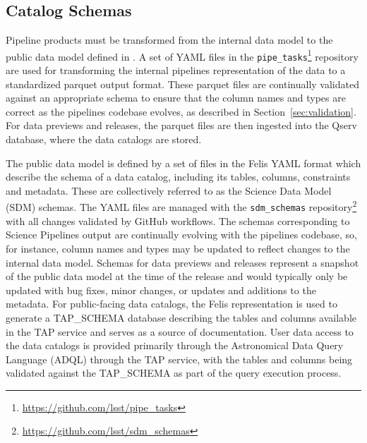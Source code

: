 \subsection{Catalog Schemas}
\label{sec:schemas}

Pipeline products must be transformed from the internal data model to the public data model defined in \citet{LSE-163}.
A set of YAML files in the \texttt{pipe\_tasks}\footnote{\url{https://github.com/lsst/pipe\_tasks}} repository are used for transforming the internal pipelines representation of the data to a standardized parquet output format.
These parquet files are continually validated against an appropriate schema to ensure that the column names and types are correct as the pipelines codebase evolves, as described in Section~\ref{sec:validation}.
For data previews and releases, the parquet files are then ingested into the Qserv database, where the data catalogs are stored.

The public data model is defined by a set of files in the Felis \citep{2024arXiv241209721M} YAML format which describe the schema of a data catalog, including its tables, columns, constraints and metadata.
These are collectively referred to as the Science Data Model (SDM) schemas.
The YAML files are managed with the \texttt{sdm\_schemas} repository\footnote{\url{https://github.com/lsst/sdm\_schemas}} with all changes validated by GitHub workflows.
The schemas corresponding to Science Pipelines output are continually evolving with the pipelines codebase, so, for instance, column names and types may be updated to reflect changes to the internal data model.
Schemas for data previews and releases represent a snapshot of the public data model at the time of the release and would typically only be updated with bug fixes, minor changes, or updates and additions to the metadata.
For public-facing data catalogs, the Felis representation is used to generate a TAP\_SCHEMA database describing the tables and columns available in the TAP service \citep{2019ivoa.spec.0927D} and serves as a source of documentation.
User data access to the data catalogs is provided primarily through the Astronomical Data Query Language (ADQL) through the TAP service, with the tables and columns being validated against the TAP\_SCHEMA as part of the query execution process.
